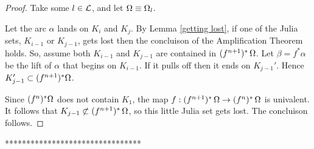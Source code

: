 {\begin{proof}
Take some $l\in {\mathcal L}$, and let ${\Omega} \equiv {\Omega}_l$. 

Let the arc $\alpha$ lands on $K_i$ and $K_j$. By Lemma \ref{getting lost}, if one of the  Julia sets,  
 $K_{i-1}$ or $K_{j-1}$, gets lost then the concluison of the Amplification Theorem  holds. 
So, assume both $K_{i-1}$ and $K_{j-1}$  are contained in $( f^{n+1})^*\, {\Omega}$. Let $\beta= f^* \alpha$ be the lift of $\alpha$ that begins on $K_{i-1}$. 
If it pulls off then  it ends on $K_{j-1}'$. Hence $K_{j-1}'\subset ( f^{n+1})^*  {\Omega}$. 

Since  $( f^n)^* {\Omega} $ does not contain $K_1$, 
the map $f: ( f^{n+1})^*\, {\Omega} \rightarrow ( f^n)^*\,  {\Omega} $ is univalent. 
It follows that $K_{j-1}\not\subset ( f^{n+1})^*\,  {\Omega} $, so this little Julia set gets lost.
The concluison follows. 
\end{proof}

********************************} 


